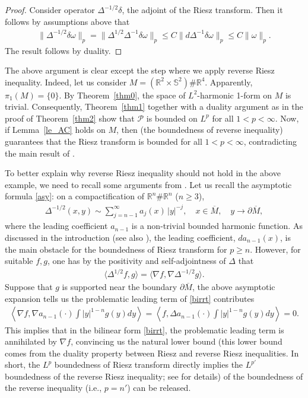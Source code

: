 \documentclass[12pt]{amsart}
\begin{document}
\begin{proof}
Consider operator $\Delta^{-1/2}\delta$, the adjoint of the Riesz transform. Then it follows by assumptions above that
\begin{align}\label{eq_inequalities}
    \|\Delta^{-1/2}\delta \omega\|_p = \|\Delta^{1/2} \Delta^{-1} \delta \omega\|_p \le C \|d \Delta^{-1} \delta \omega\|_p \le C \|\omega\|_p.
\end{align}
The result follows by duality.

\end{proof}

The above argument is clear except the step where we apply reverse Riesz inequality. Indeed, let us consider $M = (\mathbb{R}^2 \times \mathbb{S}^{2}) \# \mathbb{R}^4$. Apparently, $\pi_1(M) = \{0\}$. By Theorem~\ref{thm0}, the space of $L^2$-harmonic 1-form on $M$ is trivial. Consequently, Theorem~\ref{thm1} together with a duality argument as in the proof of Theorem~\ref{thm2} show that $\mathcal{P}$ is bounded on $L^p$ for all $1<p<\infty$. Now, if Lemma~\ref{le_AC} holds on $M$, then \cite[Theorem~1.3]{He2} (the boundedness of reverse inequality) guarantees that the Riesz transform is bounded for all $1<p<\infty$, contradicting the main result of \cite{HNS}.

To better explain why reverse Riesz inequality should not hold in the above example, we need to recall some arguments from \cite{He2}. Let us recall the asymptotic formula \eqref{asy}: on a compactification of $\mathbb{R}^n \# \mathbb{R}^n$ ($n\ge 3$), 
\begin{align*}
    \Delta^{-1/2}(x,y) \sim \sum_{j = n-1}^\infty a_j(x)\,|y|^{-j}, \quad x\in \overline{M},\quad y \to \partial \overline{M},
\end{align*}
where the leading coefficient $a_{n-1}$ is a non-trivial bounded harmonic function. As discussed in the introduction (see also \cite[Introduction]{CCH}), the leading coefficient, $d a_{n-1}(x)$, is the main obstacle for the boundedness of Riesz transform for $p\ge n$. However, for suitable $f,g$, one has by the positivity and self-adjointness of $\Delta$ that  
\begin{align}\label{birrt}
    \langle \Delta^{1/2}f, g \rangle = \langle \nabla f, \nabla \Delta^{-1/2} g \rangle.
\end{align}
Suppose that $g$ is supported near the boundary $\partial \overline{M}$, the above asymptotic expansion tells us the problematic leading term of \eqref{birrt} contributes
\begin{align}\label{asyrrt}
    \left \langle  \nabla f, \nabla a_{n-1}(\cdot) \int |y|^{1-n} g(y) dy      \right \rangle = \left \langle  f, \Delta a_{n-1}(\cdot) \int |y|^{1-n} g(y) dy \right\rangle = 0.
\end{align}
This implies that in the bilinear form \eqref{birrt}, the problematic leading term is annihilated by $\nabla f$, convincing us the natural lower bound (this lower bound comes from the duality property between Riesz and reverse Riesz inequalities. In short, the $L^p$ boundedness of Riesz transform directly implies the $L^{p'}$ boundedness of the reverse Riesz inequality; see \cite{CD} for details) of the boundedness of the reverse inequality (i.e., $p=n'$) can be released.
\end{document}
